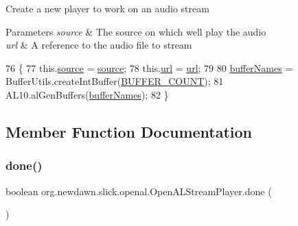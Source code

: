 Create a new player to work on an audio stream


\begin{DoxyParams}{Parameters}
{\em source} & The source on which we\textquotesingle{}ll play the audio \\
\hline
{\em url} & A reference to the audio file to stream \\
\hline
\end{DoxyParams}

\begin{DoxyCode}
76                                                    \{
77         this.\mbox{\hyperlink{classorg_1_1newdawn_1_1slick_1_1openal_1_1_open_a_l_stream_player_abe9f7d1ac52a705aa359cf3eb1c69464}{source}} = \mbox{\hyperlink{classorg_1_1newdawn_1_1slick_1_1openal_1_1_open_a_l_stream_player_abe9f7d1ac52a705aa359cf3eb1c69464}{source}};
78         this.\mbox{\hyperlink{classorg_1_1newdawn_1_1slick_1_1openal_1_1_open_a_l_stream_player_a2f903c9bc54f0a1d739ad917a8aa97f6}{url}} = \mbox{\hyperlink{classorg_1_1newdawn_1_1slick_1_1openal_1_1_open_a_l_stream_player_a2f903c9bc54f0a1d739ad917a8aa97f6}{url}};
79 
80         \mbox{\hyperlink{classorg_1_1newdawn_1_1slick_1_1openal_1_1_open_a_l_stream_player_a97e8e27c6864fcc5abe85728a3e0a60b}{bufferNames}} = BufferUtils.createIntBuffer(\mbox{\hyperlink{classorg_1_1newdawn_1_1slick_1_1openal_1_1_open_a_l_stream_player_a6fabd8395e8301d9b2ea613f8b7d739c}{BUFFER\_COUNT}});
81         AL10.alGenBuffers(\mbox{\hyperlink{classorg_1_1newdawn_1_1slick_1_1openal_1_1_open_a_l_stream_player_a97e8e27c6864fcc5abe85728a3e0a60b}{bufferNames}});
82     \}
\end{DoxyCode}


\subsection{Member Function Documentation}
\mbox{\label{classorg_1_1newdawn_1_1slick_1_1openal_1_1_open_a_l_stream_player_a64962f56b4c366c19fe3c2bff2f55842}} 
\subsubsection{\texorpdfstring{done()}{done()}}
{\footnotesize\ttfamily boolean org.\+newdawn.\+slick.\+openal.\+Open\+A\+L\+Stream\+Player.\+done (\begin{DoxyParamCaption}{ }\end{DoxyParamCaption})\hspace{0.3cm}{\ttfamily [inline]}}

